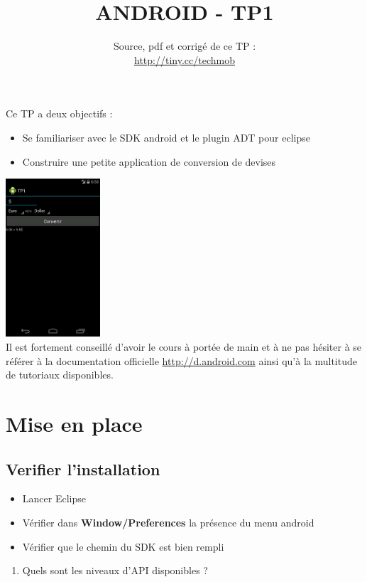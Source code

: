 \documentclass{article}
\title{ANDROID - TP1}
\date{Source, pdf et corrigé de ce TP
:\\\href{http://tiny.cc/techmob}{http://tiny.cc/techmob}}
\begin{document}
\maketitle
Ce TP a deux objectifs :
\begin{itemize}
\item Se familiariser avec le SDK android et le plugin ADT pour eclipse
\item Construire une petite application de conversion de devises
\end{itemize}
\includegraphics[width=100pt]{img/tp1.png}\\
Il est fortement conseillé d'avoir le cours à portée de main et à ne pas hésiter
à se référer à la documentation officielle
\href{http://d.android.com}{http://d.android.com} ainsi qu'à la multitude de
tutoriaux disponibles.
\section{Mise en place}
\subsection{Verifier l'installation}
\begin{itemize}
\item Lancer Eclipse
\item Vérifier dans \textbf{Window/Preferences} la présence du menu android
\item Vérifier que le chemin du SDK est bien rempli
\end{itemize}
\begin{enumerate}
\item Quels sont les niveaux d'API disponibles ?
\end{enumerate}
\end{document}
